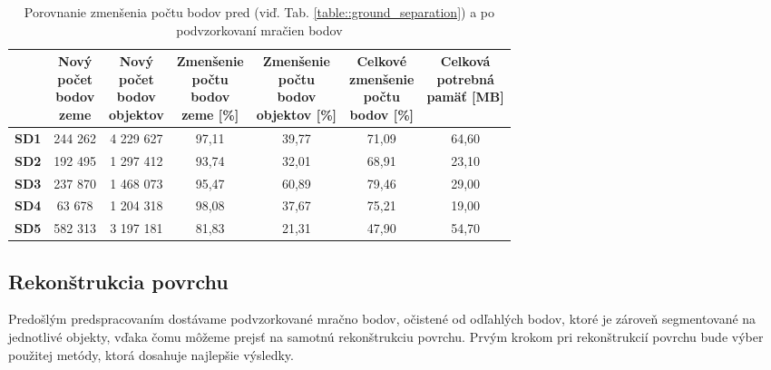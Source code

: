 \begin{table}
    \begin{center} %
        \begin{tabular}{|c || c | c | c | c | c| c|} 
         \hline
          & \thead{Nový \\ počet \\ bodov \\ zeme} &
            \thead{Nový \\ počet \\ bodov \\ objektov} &
            \thead{Zmenšenie \\ počtu \\ bodov \\ zeme [\%]} &
            \thead{Zmenšenie \\ počtu \\ bodov \\ objektov [\%]} &
            \thead{Celkové \\ zmenšenie \\ počtu \\ bodov [\%]} & 
            \thead{Celková \\ potrebná \\ pamäť [MB]} \\ [0.5ex]    
         \hline\hline
         \textbf{SD1} & 244 262  & 4 229 627 & 97,11 & 39,77 & 71,09 & 64,60  \\ 
         \hline
         \textbf{SD2} & 192 495  & 1 297 412 & 93,74 & 32,01 & 68,91 & 23,10 \\
         \hline
         \textbf{SD3} &  237 870  & 1 468 073 & 95,47 & 60,89 & 79,46 & 29,00 \\
         \hline
         \textbf{SD4} & 63 678  & 1 204 318 & 98,08 & 37,67 & 75,21 & 19,00 \\
         \hline
         \textbf{SD5} & 582 313  & 3 197 181 & 81,83 & 21,31 & 47,90 & 54,70 \\ 
         \hline
        \end{tabular}
    \caption{Porovnanie zmenšenia počtu bodov pred (viď. Tab. \ref{table::ground_separation}) a po podvzorkovaní mračien bodov}
    \label{table:subsampling}
    \end{center}
\end{table}

\subsection{Rekonštrukcia povrchu}
\noindent Predošlým predspracovaním dostávame podvzorkované mračno bodov, očistené od odľahlých bodov, ktoré je zároveň segmentované na jednotlivé objekty, vďaka čomu môžeme prejsť na samotnú rekonštrukciu povrchu. Prvým krokom pri rekonštrukcií povrchu bude výber použitej metódy, ktorá dosahuje najlepšie výsledky.  

